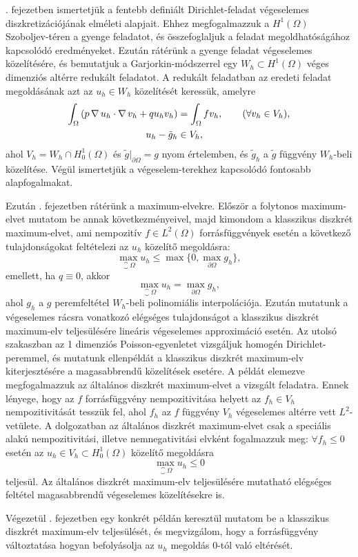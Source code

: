 . fejezetben ismertetjük a fentebb definiált Dirichlet-feladat végeselemes diszkretizációjának elméleti alapjait. Ehhez megfogalmazzuk  a $H^1(\Omega)$ Szoboljev-téren a gyenge feladatot, és összefoglaljuk a feladat megoldhatóságához kapcsolódó eredményeket. Ezután rátérünk a gyenge feladat végeselemes közelítésére, és bemutatjuk a Garjorkin-módszerrel  egy $W_h \subset H^1(\Omega)$  véges dimenziós altérre redukált feladatot. A redukált feladatban az eredeti feladat megoldásának azt az $u_h \in W_h$  közelítését keressük, amelyre
\begin{equation*}
	\begin{aligned}
		\int_{\Omega} \left( p \operatorname{\nabla} u_h \cdot \operatorname{\nabla} v_h + q u_h v_h \right) &= \int_{\Omega} f v_h,  \qquad (\forall v_h \in V_h ), \\
		u_h-\tilde{g}_h &\in V_h ,
	\end{aligned}
\end{equation*}
ahol  $V_h = W_h \cap H_0^1(\Omega)$ és $\tilde{g}|_{\partial\Omega} = g$ nyom értelemben, és $\tilde{g}_h$ a $\tilde{g}$ függvény  $W_h$-beli közelítése. Végül ismertetjük a végeselem-terekhez kapcsolódó fontosabb alapfogalmakat.

Ezután . fejezetben rátérünk a maximum-elvekre. Először a folytonos maximum-elvet mutatom be annak következményeivel, majd kimondom a klasszikus diszkrét maximum-elvet, ami nempozitív $f \in L^2(\Omega)$ forrásfüggvények esetén a következő tulajdonságokat feltételezi az $u_h$ közelítő megoldásra:
	\begin{equation*}
		\max_{\closure{\Omega}} u_h \leq \max \{0, \max_{\partial\Omega} g_h\},
	\end{equation*}
	emellett, ha $q \equiv 0$, akkor
	\begin{equation*}
		\max_{\closure{\Omega}} u_h =  \max_{\partial\Omega} g_h,
	\end{equation*}
ahol $g_h$ a $g$ peremfeltétel $W_h$-beli polinomiális interpolációja. Ezután mutatunk a végeselemes rácsra vonatkozó elégséges tulajdonságot a klasszikus diszkrét maximum-elv teljesülésére lineáris végeselemes approximáció esetén. Az utolsó szakaszban az 1 dimenziós Poisson-egyenletet vizsgáljuk homogén Dirichlet-peremmel, és mutatunk  ellenpéldát a klasszikus diszkrét maximum-elv kiterjesztésére a magasabbrendű közelítések esetére. A példát elemezve megfogalmazzuk az általános diszkrét maximum-elvet a vizsgált feladatra. Ennek lényege, hogy az $f$ forrásfüggvény nempozitivitása helyett az $f_h \in V_h$ nempozitivitását tesszük fel, ahol $f_h$ az $f$ függvény $V_h$ végeselemes altérre vett $L^2$-vetülete. A dolgozatban az általános diszkrét maximum-elvet csak a speciális alakú nempozitivitási, illetve nemnegativitási elvként fogalmazzuk meg: $\forall f_h \leq 0$ esetén az $u_h \in V_h \subset H_0^1(\Omega)$ közelítő megoldásra 
\begin{equation*}
	\max_{\closure{\Omega}} u_h \leq 0
\end{equation*}	
teljesül. Az általános diszkrét maximum-elv teljesülésére mutatható elégséges feltétel magasabbrendű végeselemes közelítésekre is.

 Végezetül . fejezetben egy konkrét példán keresztül mutatom be a klasszikus diszkrét maximum-elv teljesülését, és megvizgálom, hogy a forrásfüggvény változtatása hogyan befolyásolja az $u_h$ megoldás $0$-tól való eltérését. 

 